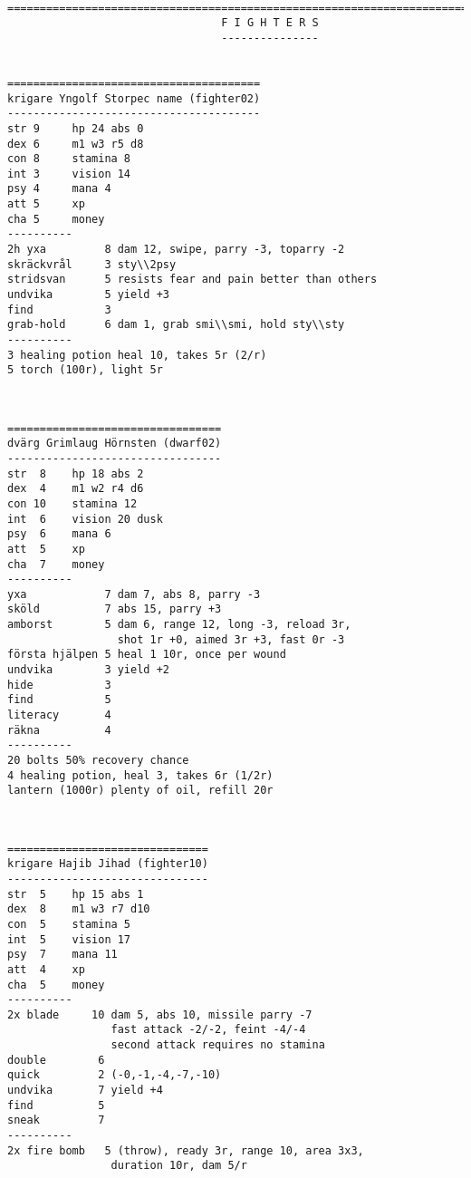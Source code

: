\

\goodbreak
\tiny \begin{samepage} \begin{verbatim}
================================================================================
                                 F I G H T E R S
                                 ---------------


=======================================
krigare Yngolf Storpec name (fighter02)
---------------------------------------
str 9     hp 24 abs 0
dex 6     m1 w3 r5 d8
con 8     stamina 8
int 3     vision 14
psy 4     mana 4
att 5     xp
cha 5     money
----------
2h yxa         8 dam 12, swipe, parry -3, toparry -2
skräckvrål     3 sty\\2psy
stridsvan      5 resists fear and pain better than others
undvika        5 yield +3
find           3
grab-hold      6 dam 1, grab smi\\smi, hold sty\\sty
----------
3 healing potion heal 10, takes 5r (2/r)
5 torch (100r), light 5r
\end{verbatim} \end{samepage} \normalsize


\

\goodbreak
\tiny \begin{samepage} \begin{verbatim}
=================================
dvärg Grimlaug Hörnsten (dwarf02)
---------------------------------
str  8    hp 18 abs 2
dex  4    m1 w2 r4 d6
con 10    stamina 12
int  6    vision 20 dusk
psy  6    mana 6
att  5    xp
cha  7    money
----------
yxa            7 dam 7, abs 8, parry -3
sköld          7 abs 15, parry +3
amborst        5 dam 6, range 12, long -3, reload 3r,
                 shot 1r +0, aimed 3r +3, fast 0r -3
första hjälpen 5 heal 1 10r, once per wound
undvika        3 yield +2
hide           3
find           5
literacy       4
räkna          4
----------
20 bolts 50% recovery chance
4 healing potion, heal 3, takes 6r (1/2r)
lantern (1000r) plenty of oil, refill 20r
\end{verbatim} \end{samepage} \normalsize


\

\goodbreak
\tiny \begin{samepage} \begin{verbatim}
===============================
krigare Hajib Jihad (fighter10)
-------------------------------
str  5    hp 15 abs 1
dex  8    m1 w3 r7 d10
con  5    stamina 5
int  5    vision 17
psy  7    mana 11
att  4    xp
cha  5    money
----------
2x blade     10 dam 5, abs 10, missile parry -7
                fast attack -2/-2, feint -4/-4
                second attack requires no stamina
double        6
quick         2 (-0,-1,-4,-7,-10)
undvika       7 yield +4
find          5
sneak         7
----------
2x fire bomb   5 (throw), ready 3r, range 10, area 3x3,
                duration 10r, dam 5/r
\end{verbatim} \end{samepage} \normalsize


